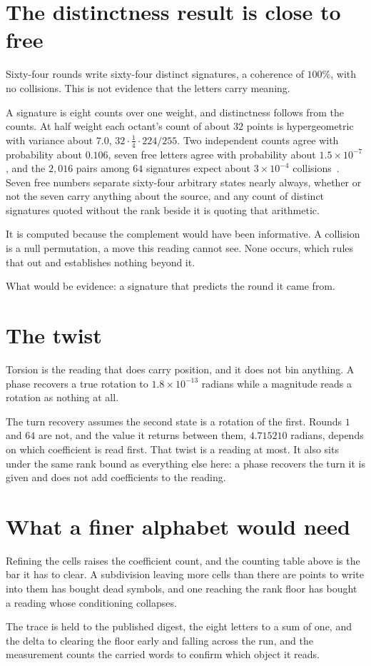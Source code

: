 \section{The distinctness result is close to free}

Sixty-four rounds write sixty-four distinct signatures, a coherence of \(100\%\), with no collisions. This is not evidence that the letters carry meaning.

A signature is eight counts over one weight, and distinctness follows from the counts. At half weight each octant's count of about \(32\) points is hypergeometric with variance about \(7.0\), \(32 \cdot \tfrac14 \cdot 224/255\). Two independent counts agree with probability about \(0.106\), seven free letters agree with probability about \(1.5 \times 10^{-7}\), and the \(2{,}016\) pairs among \(64\) signatures expect about \(3 \times 10^{-4}\) collisions~\cite{src:Feller-1968}. Seven free numbers separate sixty-four arbitrary states nearly always, whether or not the seven carry anything about the source, and any count of distinct signatures quoted without the rank beside it is quoting that arithmetic.

It is computed because the complement would have been informative. A collision is a null permutation, a move this reading cannot see. None occurs, which rules that out and establishes nothing beyond it.

What would be evidence: a signature that predicts the round it came from.

\section{The twist}

Torsion is the reading that does carry position, and it does not bin anything. A phase recovers a true rotation to \(1.8 \times 10^{-13}\) radians while a magnitude reads a rotation as nothing at all.

The turn recovery assumes the second state is a rotation of the first. Rounds \(1\) and \(64\) are not, and the value it returns between them, \(4.715210\) radians, depends on which coefficient is read first. That twist is a reading at most. It also sits under the same rank bound as everything else here: a phase recovers the turn it is given and does not add coefficients to the reading.

\section{What a finer alphabet would need}

Refining the cells raises the coefficient count, and the counting table above is the bar it has to clear. A subdivision leaving more cells than there are points to write into them has bought dead symbols, and one reaching the rank floor has bought a reading whose conditioning collapses.

The trace is held to the published digest, the eight letters to a sum of one, and the delta to clearing the floor early and falling across the run, and the measurement counts the carried words to confirm which object it reads.
